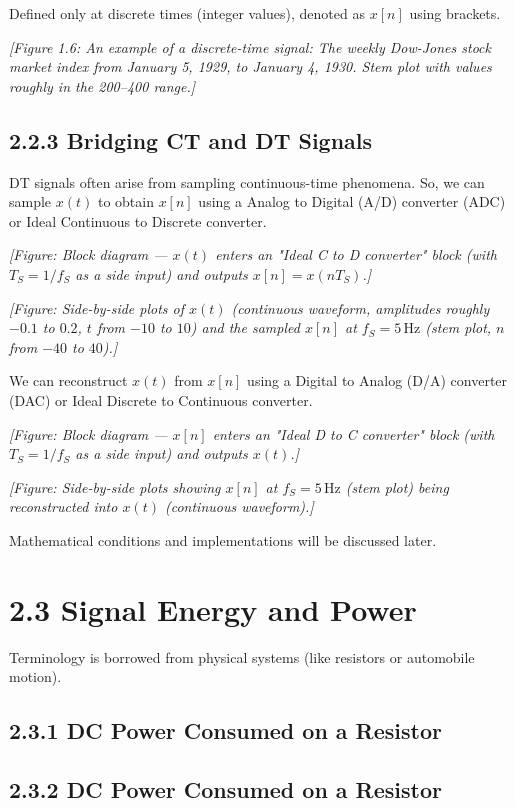 \documentclass[11pt]{article}
\begin{document}
Defined only at discrete times (integer values), denoted as $x[n]$ using brackets.

\textit{[Figure 1.6: An example of a discrete-time signal: The weekly Dow-Jones stock market index from January 5, 1929, to January 4, 1930. Stem plot with values roughly in the 200–400 range.]}

\subsection*{2.2.3 Bridging CT and DT Signals}

DT signals often arise from sampling continuous-time phenomena. So, we can sample $x(t)$ to obtain $x[n]$ using a Analog to Digital (A/D) converter (ADC) or Ideal Continuous to Discrete converter.

\textit{[Figure: Block diagram — $x(t)$ enters an "Ideal C to D converter" block (with $T_S = 1/f_S$ as a side input) and outputs $x[n] = x(nT_S)$.]}

\textit{[Figure: Side-by-side plots of $x(t)$ (continuous waveform, amplitudes roughly $-0.1$ to $0.2$, $t$ from $-10$ to $10$) and the sampled $x[n]$ at $f_S = 5\,\text{Hz}$ (stem plot, $n$ from $-40$ to $40$).]}

We can reconstruct $x(t)$ from $x[n]$ using a Digital to Analog (D/A) converter (DAC) or Ideal Discrete to Continuous converter.

\textit{[Figure: Block diagram — $x[n]$ enters an "Ideal D to C converter" block (with $T_S = 1/f_S$ as a side input) and outputs $x(t)$.]}

\textit{[Figure: Side-by-side plots showing $x[n]$ at $f_S = 5\,\text{Hz}$ (stem plot) being reconstructed into $x(t)$ (continuous waveform).]}

Mathematical conditions and implementations will be discussed later.

\section*{2.3 Signal Energy and Power}

Terminology is borrowed from physical systems (like resistors or automobile motion).

\subsection*{2.3.1 DC Power Consumed on a Resistor}

\subsection*{2.3.2 DC Power Consumed on a Resistor}
\end{document}
